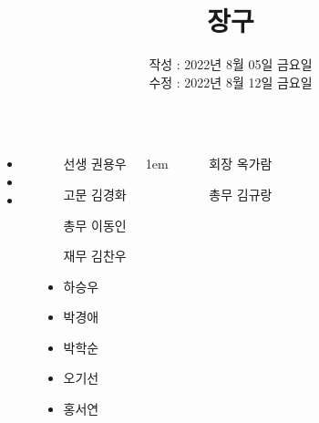 \documentclass[	20pt, 
							a1paper, 
							portrait, %
							margin=0mm, %
							innermargin=10mm,  		%
							colspace=5mm, 
							subcolspace=0mm
							]{tikzposter}
\title{장구}
\author{ 	작성 : 2022년  8월  05일 금요일 \\
			수정 : 2022년  8월  12일 금요일 }
\begin{document}
	\maketitle

	\begin{columns}


			{
				\begin{LARGE}
					\begin{itemize}
					\item 
					\item 
					\item 
					\end{itemize}
				\end{LARGE}
			}

			{
					\setlength{\leftmargini}{5em}
				\begin{LARGE}
					\begin{itemize}
					\item [선생] 권용우
					\item [고문] 김경화
					\item [총무] 이동인
					\item [재무] 김찬우
					\item 하승우
					\item 박경애
					\item 박학순
					\item 오기선
					\item 홍서연
					\end{itemize}
				\end{LARGE}
			}


			{
					\setlength{\leftmargini}{4em}
					\setlength{\labelsep} {1em}
				\begin{LARGE}
					\begin{itemize}
					\item [회장] 옥가람
					\item [총무] 김규랑
					\end{itemize}
				\end{LARGE}
			}









\end{columns}
\end{document}
